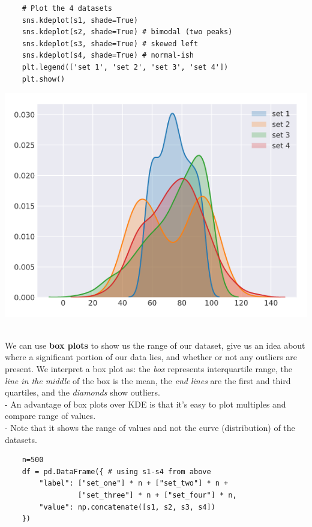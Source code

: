 \documentclass[11pt, a4paper]{article}
\begin{document}
\begin{spacing}{1.1}
\begin{minipage}[c]{10.3cm}
\begin{lstlisting}
	# Plot the 4 datasets
	sns.kdeplot(s1, shade=True) 
	sns.kdeplot(s2, shade=True) # bimodal (two peaks)
	sns.kdeplot(s3, shade=True) # skewed left
	sns.kdeplot(s4, shade=True) # normal-ish
	plt.legend(['set 1', 'set 2', 'set 3', 'set 4'])
	plt.show() \end{lstlisting}\vspace*{1mm}
	\end{minipage}
	\begin{minipage}[c]{10cm}
		\includegraphics[scale=.48]{kde}
	\end{minipage} \\
	We can use \textbf{box plots} to show us the range of our dataset, give us an idea about where a significant portion of our data lies, and whether or not any outliers are present. We interpret a box plot as: the \textit{box} represents interquartile range, the \textit{line in the middle} of the box is the mean, the \textit{end lines} are the first and third quartiles, and the \textit{diamonds} show outliers. \\
	\hspace*{3mm} - An advantage of box plots over KDE is that it's easy to plot multiples and compare range of values. \\
	\hspace*{3mm} - Note that it shows the range of values and not the curve (distribution) of the datasets. \\
	\begin{minipage}[c]{10.3cm}
	\begin{lstlisting}
	n=500
	df = pd.DataFrame({ # using s1-s4 from above
		"label": ["set_one"] * n + ["set_two"] * n + 
		         ["set_three"] * n + ["set_four"] * n,
		"value": np.concatenate([s1, s2, s3, s4])
	})
	

\end{lstlisting}
\end{minipage}
\end{spacing}
\end{document}
